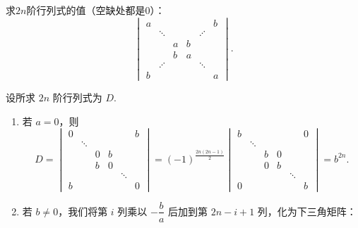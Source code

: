 \begin{exercise}
\begin{exgroup}
        \item 求$2n$阶行列式的值（空缺处都是0）：
        \[\begin{vmatrix}
                a &         &   &   &         & b \\
                  & \ddots  &   &   & \iddots &   \\
                  &         & a & b &         &   \\
                  &         & b & a &         &   \\
                  & \iddots &   &   & \ddots  &   \\
                b &         &   &   &         & a
            \end{vmatrix}.\]
        \begin{answer}
            设所求 $2n$ 阶行列式为 $D$.
            \begin{enumerate}
                \item 若 $a=0$，则
                    \[
                        D = \begin{vmatrix}
                            0 &         &   &   &         & b \\
                              & \ddots  &   &   &         &   \\
                              &         & 0 & b &         &   \\
                              &         & b & 0 &         &   \\
                              &         &   &   & \ddots  &   \\
                            b &         &   &   &         & 0
                        \end{vmatrix}
                        = (-1)^{\frac{2n(2n-1)}{2}} \begin{vmatrix}
                            b &         &   &   &         & 0 \\
                              & \ddots  &   &   &         &   \\
                              &         & b & 0 &         &   \\
                              &         & 0 & b &         &   \\
                              &         &   &   & \ddots  &   \\
                            0 &         &   &   &         & b
                        \end{vmatrix}
                        = b^{2n}.
                    \]
                \item 若 $b \neq 0$，我们将第 $i$ 列乘以 $-\dfrac{b}{a}$ 后加到第 $2n-i+1$ 列，化为下三角矩阵：

\end{enumerate}
\end{answer}
\end{exgroup}
\end{exercise}
